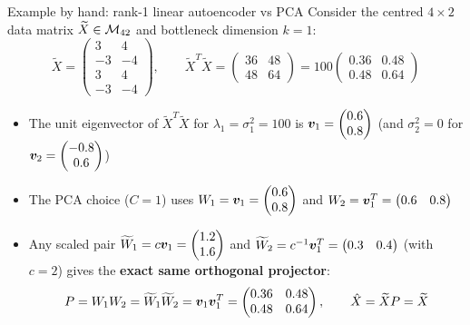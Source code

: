 \documentclass[aspectratio=169]{beamer}\usepackage[]{graphicx}\usepackage[]{xcolor}
\begin{document}
\begin{frame}{Example by hand: rank-1 linear autoencoder vs PCA}
Consider the centred $4 \times 2$ data matrix $\widetilde{X} \in \mathcal{M}_{42}$ and bottleneck dimension $k = 1$:
\[
\widetilde{X} = \begin{pmatrix} 3 & 4 \\ -3 & -4 \\ 3 & 4 \\ -3 & -4 \end{pmatrix}, \qquad
\widetilde{X}^T \widetilde{X} = \begin{pmatrix} 36 & 48 \\ 48 & 64 \end{pmatrix} = 100 \begin{pmatrix} 0.36 & 0.48 \\ 0.48 & 0.64 \end{pmatrix}
\]
\vfill
\begin{itemize}
\item The unit eigenvector of $\widetilde{X}^T \widetilde{X}$ for $\lambda_1 = \sigma_1^2 = 100$ is $\bm{v}_1 = \begin{pmatrix} 0.6 \\ 0.8 \end{pmatrix}$ (and $\sigma_2^2 = 0$ for $\bm{v}_2 = \begin{pmatrix} -0.8 \\ 0.6 \end{pmatrix}$)
\item The PCA choice ($C = 1$) uses $W_1 = \bm{v}_1 = \begin{pmatrix} 0.6 \\ 0.8 \end{pmatrix}$ and $W_2 = \bm{v}_1^T = \begin{pmatrix} 0.6 & 0.8 \end{pmatrix}$
\item Any scaled pair $\widetilde{W}_1 = c \bm{v}_1 = \begin{pmatrix} 1.2 \\ 1.6 \end{pmatrix}$ and $\widetilde{W}_2 = c^{-1} \bm{v}_1^T = \begin{pmatrix} 0.3 & 0.4 \end{pmatrix}$ (with $c = 2$) gives the \textbf{exact same orthogonal projector}:
\[
P = W_1 W_2 = \widetilde{W}_1 \widetilde{W}_2 = \bm{v}_1 \bm{v}_1^T = \begin{pmatrix} 0.36 & 0.48 \\ 0.48 & 0.64 \end{pmatrix}, \qquad \hat{X} = \widetilde{X} P = \widetilde{X}
\]
\end{itemize}
\end{frame}
\end{document}
